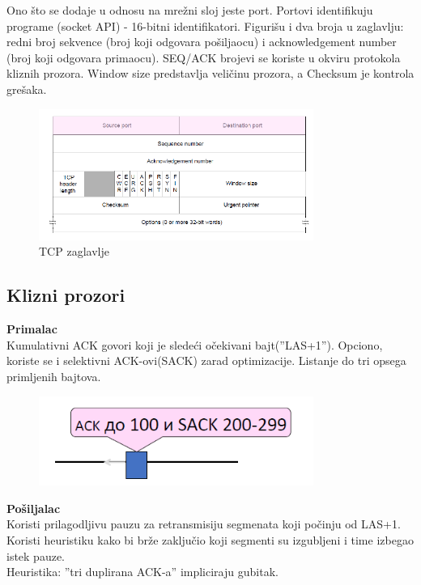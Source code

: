 \documentclass{article} %
\begin{document}
\noindent Ono \v sto se dodaje u odnosu na mre\v zni sloj jeste port. Portovi identifikuju programe (socket API) - 16-bitni identifikatori. Figuri\v su i dva broja u zaglavlju: redni broj sekvence (broj koji odgovara po\v siljaocu) i acknowledgement number (broj koji odgovara primaocu). SEQ/ACK brojevi se koriste u okviru protokola kliznih prozora. Window size predstavlja veli\v cinu prozora, a Checksum je kontrola gre\v saka.

\begin{figure}[H]
	\centering
	\includegraphics[width=0.8\textwidth]{tcp/zaglavlje.png}
	\caption{TCP zaglavlje}
\end{figure}



\subsection{Klizni prozori}

\noindent \textbf{Primalac}
\\ Kumulativni ACK govori koji je slede\' ci o\v cekivani bajt(''LAS+1''). Opciono, koriste se i selektivni ACK-ovi(SACK) zarad optimizacije. Listanje do tri opsega primljenih bajtova.

\begin{figure}[H]
	\centering
	\includegraphics[width=0.8\textwidth]{tcp/primalac.png}
\end{figure}


\noindent\textbf{Po\v siljalac}
\\ Koristi prilagodljivu pauzu za retransmisiju segmenata koji po\v cinju od LAS+1. Koristi heuristiku kako bi br\v ze zaklju\v cio koji segmenti su izgubljeni i time izbegao istek pauze.
\\ Heuristika: ''tri duplirana ACK-a'' impliciraju gubitak.
\end{document}
